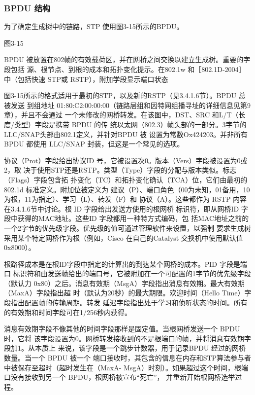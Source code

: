 \subsubsection{ BPDU 结构}

为了确定生成树中的链路，STP 使用图3-15所示的BPDU。

图3-15

BPDU 被放置在802帧的有效载荷区，并在网桥之间交换以建立生成树。重要的字段包括
源、根节点、到根的成本和拓扑变化提示。在802.1w 和［802.1D-2004］中（包括快速 STP或
RSTP），附加学段显示端口状态

图3-15所示的格式适用于最初的STP，以及新的RSTP（见3.4.1.6节）。BPDU 总被发送
到组地址 01:80:C2:00:00:00（链路层组和因特网组播寻址的详细信息见第9章），并且不会通过
一个未修改的网桥转发。在该图中，DST、SRC 和L/T（长度/类型）字段是携带 BPDU 的传
统以太网（802.3）帧头部的一部分。3字节的LLC/SNAP头部由802.1定义，并针对BPDU 被
设置为常数Ox424203。并非所有BPDU 都使用 LLC/SNAP 封装，但这是一个常见的选项。

协议（Prot）字段给出协议ID 号，它被设置次0。版本（Vers）字段被设置为0或2，取
决于使用STP还是RSTP。类型（Type）字段的分配与版本类似。标志（Flags）字段包含拓
扑变化（TC）和拓扑变化确认（TCA）位，它们由最初的802.1d 标准定义。附加位被定义为
建议（P）、端口角色（00为未知，01备用，10为根，11为指定）、学习（L）、转发（F）和
协议（A）。这些都作为 RSTP 内容在3.4.1.6节中讨论。根 ID 字段给出发送方使用的根网桥
标识符，即从网桥ID 字段中获得的MAC地址。这些ID 字段都用一种特方式编码，包
括MAC地址之前的一个2字节的优先级字段。优先级的值可通过管理软件来设置，以强制
要求生成树采用某个特定网桥作为根（例如，Cisco 在自己的Catalyst 交换机中使用默认值
0x8000）。

根路径成本是在根ID字段中指定的计算出的到达某个网桥的成本。PID 字段是端口
标识符和由发送帧给出的端口号，它被附加在一个可配置的1字节的优先级字段（默认力
0x80）之后。消息有效期（MsgA）字段指出消息有效期。最大有效期（MaxA）字段指出超
时（默认为20秒）的最大期限。欢迎时间（Hello Time）字段指出配置帧的传输周期。转发
延迟字段指出处于学习和侦听状态的时间。所有的有效期和时间字段可在1/256秒内获得。

消息有效期字段不像其他的时间字段那样是固定值。当根网桥发送一个 BPDU时，它将
该字段设置为0。网桥转发接收到的不是根端口的帧，并将消息有效期字段加1。从本质上
来说，该字段是一个跳步计数器，用于记录BPDU 经过的网桥数量。当一个 BPDU 被一个
端口接收时，其包含的信息在内存和STP算法参与者中被保存至超时（超时发生在（MaxA-
MsgA）时刻）。如果超过这个时间，根端口没有接收到另一个 BPDU，根网桥被宣布“死亡”，
并重新开始根网桥选举过程。

